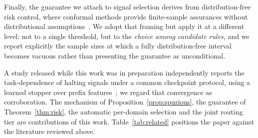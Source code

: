 \documentclass[acmsmall]{acmart}
\theoremstyle{acmdefinition}%
\theoremstyle{acmplain}}{}%
\begin{document}
Finally, the guarantee we attach to signal selection derives from distribution-free risk control, where conformal methods provide finite-sample assurances without distributional assumptions~\cite{angelopoulos2021gentle,angelopoulos2024conformal}. We adopt that framing but apply it at a different level: not to a single threshold, but to the \emph{choice among candidate rules}, and we report explicitly the sample sizes at which a fully distribution-free interval becomes vacuous rather than presenting the guarantee as unconditional.

A study released while this work was in preparation independently reports the task-dependence of halting signals under a common checkpoint protocol, using a learned stopper over prefix features~\cite{dong2026learning}; we regard that convergence as corroboration. The mechanism of Proposition~\ref{prop:spurious}, the guarantee of Theorem~\ref{thm:risk}, the automatic per-domain selection and the joint routing tier are contributions of this work. Table~\ref{tab:related} positions the paper against the literature reviewed above.
\end{document}
